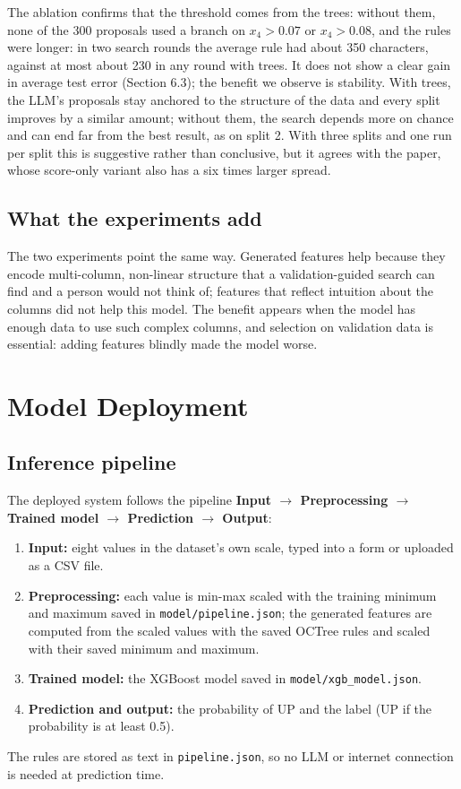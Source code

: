\documentclass[11pt]{article}
\newcommand{\code}[1]{\texttt{#1}}
\begin{document}
The ablation confirms that the threshold comes from the trees: without them, none of the 300
proposals used a branch on $x_4>0.07$ or $x_4>0.08$, and the rules were longer: in two search rounds the
average rule had about 350 characters, against at most about 230 in any round with trees. It does not show a clear gain in average test error
(Section 6.3); the benefit we observe is stability. With trees, the LLM's proposals stay anchored to
the structure of the data and every split improves by a similar amount; without them, the search
depends more on chance and can end far from the best result, as on split 2. With three splits and
one run per split this is suggestive rather than conclusive, but it agrees with the paper, whose
score-only variant also has a six times larger spread.

\subsection{What the experiments add}
The two experiments point the same way. Generated features help because they encode multi-column,
non-linear structure that a validation-guided search can find and a person would not think of;
features that reflect intuition about the columns did not help this model. The benefit appears when
the model has enough data to use such complex columns, and selection on validation data is
essential: adding features blindly made the model worse.

\section{Model Deployment}\label{sec:deploy}

\subsection{Inference pipeline}
The deployed system follows the pipeline \textbf{Input $\rightarrow$ Preprocessing $\rightarrow$
Trained model $\rightarrow$ Prediction $\rightarrow$ Output}:
\begin{enumerate}
  \item \textbf{Input:} eight values in the dataset's own scale, typed into a form or uploaded as a
        CSV file.
  \item \textbf{Preprocessing:} each value is min-max scaled with the training minimum and maximum
        saved in \code{model/pipeline.json}; the generated features are computed from the scaled
        values with the saved OCTree rules and scaled with their saved minimum and maximum.
  \item \textbf{Trained model:} the XGBoost model saved in \code{model/xgb\_model.json}.
  \item \textbf{Prediction and output:} the probability of UP and the label (UP if the probability
        is at least 0.5).
\end{enumerate}
The rules are stored as text in \code{pipeline.json}, so no LLM or internet connection is needed at
prediction time.
\end{document}
